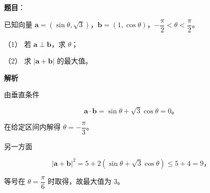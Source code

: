 \begin{answer}

\textbf{题目}：

已知向量 $\boldsymbol a=(\sin\theta,\sqrt3)$，$\boldsymbol b=(1,\cos\theta)$，$-\dfrac\pi2<\theta<\dfrac\pi2$。

（1） 若 $\boldsymbol a\perp\boldsymbol b$，求 $\theta$；

（2） 求 $|\boldsymbol a+\boldsymbol b|$ 的最大值。

\textbf{解析}


由垂直条件

\nopagebreak[4]
\[
\boldsymbol a\cdot\boldsymbol b=\sin\theta+\sqrt3\cos\theta=0\text{。}
\]

在给定区间内解得 $\theta=-\dfrac\pi3$。


另一方面

\nopagebreak[4]
\[
|\boldsymbol a+\boldsymbol b|^2
=5+2(\sin\theta+\sqrt3\cos\theta)\leqslant5+4=9\text{，}
\]

等号在 $\theta=\dfrac\pi6$ 时取得，故最大值为 $3$。



\end{answer}
